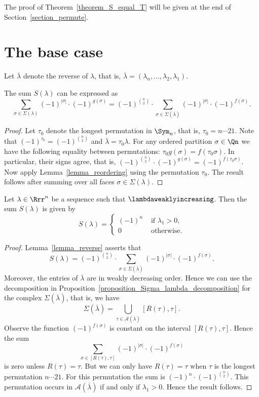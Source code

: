 The proof of Theorem~\ref{theorem_S_equal_T} will
be given
at the end of Section~\ref{section_permute}.

\section{The base case}
\label{section_base_case}

Let $\overline{\lambda}$ denote the
reverse of $\lambda$, that is,
$\overline{\lambda} = (\lambda_{n}, \ldots, \lambda_{2}, \lambda_{1})$.
\begin{lemma}
The sum $S(\lambda)$ can be expressed as
$$
\sum_{\sigma \in \Sigma(\lambda)}
(-1)^{|\sigma|} \cdot (-1)^{g(\sigma)} 
=
(-1)^{\binom{n}{2}}
\cdot
\sum_{\sigma \in \Sigma(\overline{\lambda})}
(-1)^{|\sigma|} \cdot (-1)^{f(\sigma)} . 
$$
\label{lemma_reverse}
\end{lemma}
\begin{proof}
Let $\tau_{0}$ denote the longest permutation
in $\Sym_{n}$,
that is,
$\tau_{0} = n \cdots 21$.
Note that $(-1)^{\tau_{0}} = (-1)^{\binom{n}{2}}$
and $\overline{\lambda} = \tau_{0} \lambda$.
For any ordered partition $\sigma \in \Qn$ 
we have the
following equality between permutations:
$\tau_{0} g(\sigma) = f(\tau_{0} \sigma)$.
In particular, their signs agree, that is,
$(-1)^{\binom{n}{2}} \cdot (-1)^{g(\sigma)}
= 
(-1)^{f(\tau_{0} \sigma)}$.
Now apply Lemma~\ref{lemma_reordering}
using the permutation $\tau_{0}$.
The result follows after summing over all faces
$\sigma \in \Sigma(\lambda)$.
\end{proof}


\begin{prop}
Let $\lambda \in \Rrr^{n}$ be a sequence such that
$\lambdaweaklyincreasing$.
Then the sum $S(\lambda)$ is given by
$$
S(\lambda)
=
\begin{cases}
(-1)^{n} & \text{ if } \lambda_{1} > 0, \\
0 & \text{ otherwise.}
\end{cases}
$$ 
\label{proposition_S_lambda_increasing}
\end{prop}
\begin{proof}
Lemma~\ref{lemma_reverse}
asserts that
$$
S(\lambda)
=
(-1)^{\binom{n}{2}}
\cdot
\sum_{\sigma\in\Sigma(\overline{\lambda})}
(-1)^{|\sigma|} \cdot (-1)^{f(\sigma)}.
$$
Moreover,
the entries of 
$\overline{\lambda}$
are in weakly decreasing order.
Hence we can use
the decomposition
in Proposition~\ref{proposition_Sigma_lambda_decomposition}
for the complex 
$\Sigma(\overline{\lambda})$,
that is, we have
$$
\Sigma(\overline{\lambda})
=
\bigcup_{\tau \in \mathcal{A}(\overline{\lambda})} [R(\tau), \tau] .
$$
Observe the function
$(-1)^{f(\sigma)}$
is constant on the interval
$[R(\tau), \tau]$.
Hence the sum
$$ \sum_{\sigma \in [R(\tau), \tau]} (-1)^{|\sigma|} \cdot (-1)^{f(\sigma)} $$
is zero unless $R(\tau) = \tau$.
But we can only have $R(\tau)=\tau$
when $\tau$ is the longest permutation
$n \cdots 21$. For this permutation
the sum is $(-1)^{n} \cdot (-1)^{\binom{n}{2}}$.
This permutation occurs in $\mathcal{A}(\overline{\lambda})$
if and only if $\lambda_{1} > 0$.
Hence the result follows.
\end{proof}

